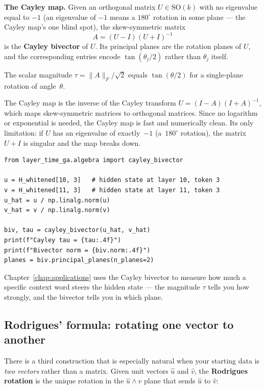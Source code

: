 \documentclass[11pt, twoside, openright]{memoir}
\newcommand{\op}{\wedge}          %
\begin{document}
\begin{gabox}
\textbf{The Cayley map.}
Given an orthogonal matrix $U \in \mathrm{SO}(k)$ with no eigenvalue
equal to $-1$ (an eigenvalue of $-1$ means a $180^\circ$ rotation in
some plane --- the Cayley map's one blind spot), the skew-symmetric matrix
\[
  A = (U - I)(U + I)^{-1}
\]
is the \textbf{Cayley bivector} of $U$.  Its principal planes are the
rotation planes of $U$, and the corresponding entries encode
$\tan(\theta_j / 2)$ rather than $\theta_j$ itself.

The scalar magnitude $\tau = \|A\|_F / \sqrt{2}$ equals $\tan(\theta/2)$
for a single-plane rotation of angle~$\theta$.
\end{gabox}

The Cayley map is the inverse of the Cayley transform
$U = (I - A)(I + A)^{-1}$, which maps skew-symmetric matrices to
orthogonal matrices.  Since no logarithm or exponential is needed, the
Cayley map is fast and numerically clean.  Its only limitation: if $U$
has an eigenvalue of exactly~$-1$ (a~$180^\circ$ rotation), the matrix
$U + I$ is singular and the map breaks down.

\begin{lstlisting}[caption={Cayley bivector from two vectors}]
from layer_time_ga.algebra import cayley_bivector

u = H_whitened[10, 3]   # hidden state at layer 10, token 3
v = H_whitened[11, 3]   # hidden state at layer 11, token 3
u_hat = u / np.linalg.norm(u)
v_hat = v / np.linalg.norm(v)

biv, tau = cayley_bivector(u_hat, v_hat)
print(f"Cayley tau = {tau:.4f}")
print(f"Bivector norm = {biv.norm:.4f}")
planes = biv.principal_planes(n_planes=2)
\end{lstlisting}

Chapter~\ref{chap:applications} uses the Cayley bivector to measure how
much a specific context word steers the hidden state --- the magnitude
$\tau$ tells you how strongly, and the bivector tells you in which plane.

\subsection*{Rodrigues' formula: rotating one vector to another}

There is a third construction that is especially natural when your
starting data is \emph{two vectors} rather than a matrix.  Given unit
vectors $\hat{u}$ and $\hat{v}$, the \textbf{Rodrigues rotation} is the
unique rotation in the $\hat{u} \op \hat{v}$ plane that sends $\hat{u}$
to $\hat{v}$:
\end{document}
